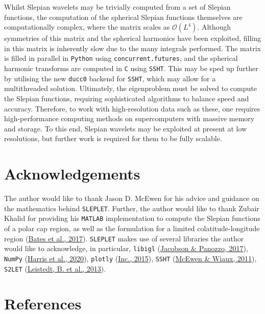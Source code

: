 \documentclass[
]{article}
\begin{document}
Whilst Slepian wavelets may be trivially computed from a set of Slepian
functions, the computation of the spherical Slepian functions themselves
are computationally complex, where the matrix scales as
\(\mathcal{O}(L^{4})\). Although symmetries of this matrix and the
spherical harmonics have been exploited, filling in this matrix is
inherently slow due to the many integrals performed. The matrix is
filled in parallel in \texttt{Python} using \texttt{concurrent.futures},
and the spherical harmonic transforms are computed in \texttt{C} using
\texttt{SSHT}. This may be sped up further by utilising the new
\texttt{ducc0} backend for \texttt{SSHT}, which may allow for a
multithreaded solution. Ultimately, the eigenproblem must be solved to
compute the Slepian functions, requiring sophisticated algorithms to
balance speed and accuracy. Therefore, to work with high-resolution data
such as these, one requires high-performance computing methods on
supercomputers with massive memory and storage. To this end, Slepian
wavelets may be exploited at present at low resolutions, but further
work is required for them to be fully scalable.

\hypertarget{acknowledgements}{%
\section{Acknowledgements}\label{acknowledgements}}

The author would like to thank Jason D. McEwen for his advice and
guidance on the mathematics behind \texttt{SLEPLET}. Further, the author
would like to thank Zubair Khalid for providing his \texttt{MATLAB}
implementation to compute the Slepian functions of a polar cap region,
as well as the formulation for a limited colatitude-longitude region
(\protect\hyperlink{ref-Bates2017}{Bates et al., 2017}).
\texttt{SLEPLET} makes use of several libraries the author would like to
acknowledge, in particular, \texttt{libigl}
(\protect\hyperlink{ref-Libigl2017}{Jacobson \& Panozzo, 2017}),
\texttt{NumPy} (\protect\hyperlink{ref-Harris2020}{Harris et al.,
2020}), \texttt{plotly} (\protect\hyperlink{ref-Plotly2015}{Inc.,
2015}), \texttt{SSHT} (\protect\hyperlink{ref-McEwen2011}{McEwen \&
Wiaux, 2011}), \texttt{S2LET}
(\protect\hyperlink{ref-Leistedt2013}{Leistedt, B. et al., 2013}).

\hypertarget{references}{%
\section*{References}\label{references}}
\end{document}
